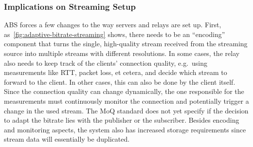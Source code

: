 \subsubsection{Implications on Streaming Setup}
ABS forces a few changes to the way servers and relays are set up.
First, as~\autoref{fig:adaptive-bitrate-streaming} shows, there needs to 
be an ``encoding'' component that turns the single, high-quality stream  
received from the streaming source into multiple streams with different resolutions.
In some cases, the relay also needs to keep track of the clients' connection quality, e.g.~using 
measurements like RTT, packet loss, et cetera, and decide which stream to forward to the client.
In other cases, this can also be done by the client itself.
Since the connection quality can change dynamically, the one responsible for
the measurements must continuously monitor the connection and potentially trigger a change in 
the used stream.
The MoQ standard does not yet specify if the decision to adapt the bitrate lies with the
publisher or the subscriber.
Besides encoding and monitoring aspects, the system also has increased storage requirements
since stream data will essentially be duplicated.
